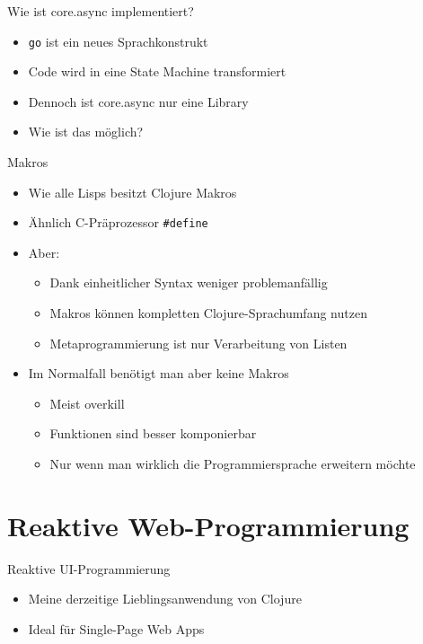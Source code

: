 \documentclass[presentation]{beamer}
\begin{document}
\begin{frame}[fragile]{Wie ist core.async implementiert?}
  \begin{itemize}
  \item \lstinline{go} ist ein neues Sprachkonstrukt
  \item Code wird in eine State Machine transformiert
  \item Dennoch ist core.async nur eine Library
  \item Wie ist das möglich?
  \end{itemize}
\end{frame}

\begin{frame}[fragile]{Makros}
  \begin{itemize}
  \item Wie alle Lisps besitzt Clojure Makros
  \item Ähnlich C-Präprozessor \lstinline{#define}
  \item Aber:
    \begin{itemize}
    \item Dank einheitlicher Syntax weniger problemanfällig
    \item Makros können kompletten Clojure-Sprachumfang nutzen
    \item Metaprogrammierung ist nur Verarbeitung von Listen
    \end{itemize}
  \item Im Normalfall benötigt man aber keine Makros
    \begin{itemize}
    \item Meist overkill
    \item Funktionen sind besser komponierbar
    \item Nur wenn man wirklich die Programmiersprache erweitern möchte
    \end{itemize}
  \end{itemize}
\end{frame}

\section{Reaktive Web-Programmierung}

\begin{frame}{Reaktive UI-Programmierung}
  \begin{itemize}
  \item Meine derzeitige Lieblingsanwendung von Clojure
  \item Ideal für Single-Page Web Apps
  \end{itemize}
\end{frame}
\end{document}
